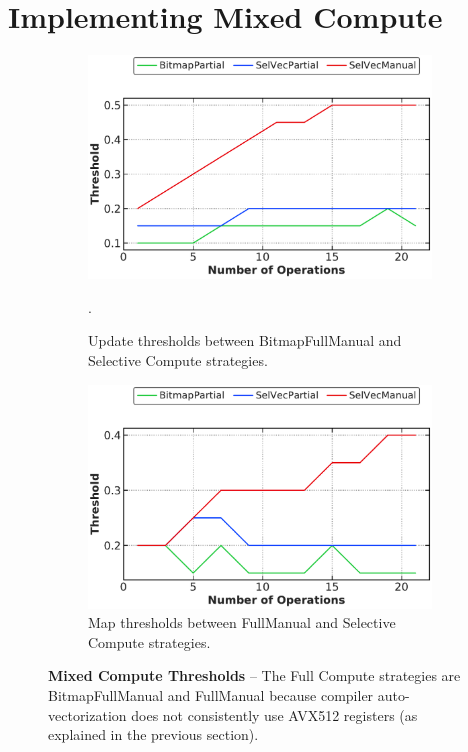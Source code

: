 \documentclass[12pt]{cmuthesis}
\begin{document}
\section{Implementing Mixed Compute}
\begin{figure}[t!]
\captionsetup[subfigure]{justification=justified}
\centering
\begin{subfigure}[t]{.49\linewidth}
 \centering
 \includegraphics[width=0.9\linewidth]{eval/snbs_thres_update.pdf}
 \caption{Update thresholds between BitmapFullManual and Selective Compute strategies.}.
  \label{fig:snbs_thres_update}
\end{subfigure}
\begin{subfigure}[t]{.49\linewidth}
 \centering
 \includegraphics[width=0.9\linewidth]{eval/snbs_thres_map.pdf}
 \caption{Map thresholds between FullManual and Selective Compute strategies.}
  \label{fig:snbs_thres_map}
\end{subfigure}
\caption{\textbf{Mixed Compute Thresholds} -- The Full Compute strategies are BitmapFullManual and FullManual because compiler auto-vectorization does not consistently use AVX512 registers (as explained in the previous section).}
\label{fig:snbs_thres}
\end{figure}
\end{document}
